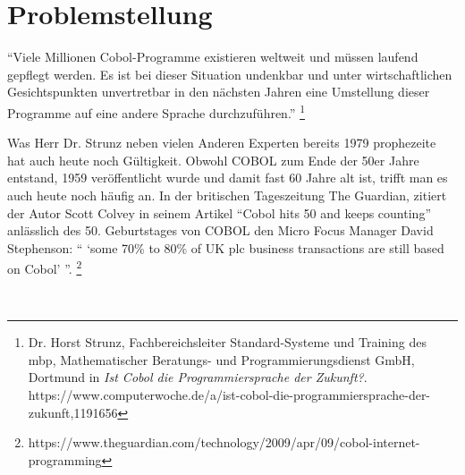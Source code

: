 \section{Problemstellung}

``Viele Millionen Cobol-Programme existieren weltweit und müssen laufend gepflegt werden.
Es ist bei dieser Situation undenkbar und unter wirtschaftlichen Gesichtspunkten unvertretbar in den nächsten Jahren eine Umstellung dieser Programme auf eine andere Sprache durchzuführen.'' \footnote{Dr. Horst Strunz, Fachbereichsleiter Standard-Systeme und Training des mbp, Mathematischer Beratungs- und Programmierungsdienst GmbH, Dortmund in \textit{Ist Cobol die Programmiersprache der Zukunft?}. \\ https://www.computerwoche.de/a/ist-cobol-die-programmiersprache-der-zukunft,1191656}

Was Herr Dr. Strunz neben vielen Anderen Experten bereits 1979 prophezeite hat auch heute noch Gültigkeit. Obwohl COBOL zum Ende der 50er Jahre entstand, 1959 veröffentlicht wurde und damit fast 60 Jahre alt ist, trifft man es auch heute noch häufig an. In der britischen Tageszeitung The Guardian, zitiert der Autor Scott Colvey in seinem Artikel ``Cobol hits 50 and keeps counting'' anlässlich des 50. Geburtstages von COBOL den Micro Focus Manager David Stephenson: `` `some 70\% to 80\% of UK plc business transactions are still based on Cobol' ''.
\footnote{https://www.theguardian.com/technology/2009/apr/09/cobol-internet-programming}


\\


